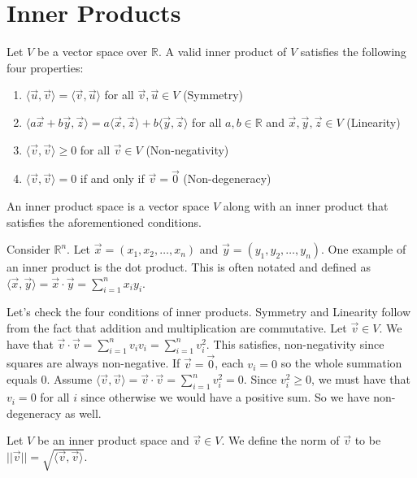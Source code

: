 \chapter{Inner Products}

Let $V$ be a vector space over $\mathbb{R}$. A valid inner product of $V$ satisfies the following four properties:
\begin{enumerate}
    \item $\langle\vec{u},\vec{v}\rangle=\langle\vec{v},\vec{u}\rangle$ for all $\vec{v},\vec{u}\in V$ (Symmetry)
    \item $\langle a\vec{x}+b\vec{y},\vec{z}\rangle=a\langle\vec{x},\vec{z}\rangle+b\langle\vec{y},\vec{z}\rangle$ for all $a,b\in\mathbb{R}$ and $\vec{x},\vec{y},\vec{z}\in V$ (Linearity)
    \item $\langle\vec{v},\vec{v}\rangle\geq 0$ for all $\vec{v}\in V$ (Non-negativity)
    \item $\langle\vec{v},\vec{v}\rangle=0$ if and only if $\vec{v}=\vec{0}$ (Non-degeneracy)
\end{enumerate}
\begin{definition}
    An inner product space is a vector space $V$ along with an inner product that satisfies the aforementioned conditions.
\end{definition}
\begin{example}
    Consider $\mathbb{R}^n$. Let $\vec{x}=(x_1, x_2,\ldots, x_n)$ and $\vec{y}=(y_1,y_2,\ldots,y_n)$. One example of an inner product is the dot product. This is often notated and defined as $\langle\vec{x},\vec{y}\rangle=\vec{x}\cdot\vec{y}=\sum_{i=1}^n x_iy_i$.

    Let's check the four conditions of inner products. Symmetry and Linearity follow from the fact that addition and multiplication are commutative. Let $\vec{v}\in V$. We have that $\vec{v}\cdot\vec{v}=\sum_{i=1}^n v_iv_i=\sum_{i=1}^n v_i^2$. This satisfies, non-negativity since squares are always non-negative. If $\vec{v}=\vec{0}$, each $v_i=0$ so the whole summation equals $0$. Assume $\langle\vec{v},\vec{v}\rangle=\vec{v}\cdot\vec{v}=\sum_{i=1}^n v_i^2=0$. Since $v_i^2\geq 0$, we must have that $v_i=0$ for all $i$ since otherwise we would have a positive sum. So we have non-degeneracy as well.
\end{example}
\begin{definition}
    Let $V$ be an inner product space and $\vec{v}\in V$. We define the norm of $\vec{v}$ to be $||\vec{v}||=\sqrt{\langle\vec{v},\vec{v}\rangle}$.
\end{definition}
